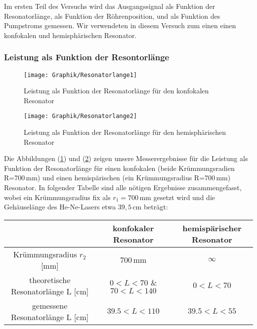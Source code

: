 \documentclass[10pt,twoside]{article}
\renewcommand{\1}{^{-1}}
\renewcommand{\2}{^{-2}}
\newcommand{\3}{^{-3}}
\newcommand{\4}{^{-4}}
\newcommand{\5}{^{-5}}
\newcommand{\6}{^{-6}}
\newcommand{\7}{^{-7}}
\newcommand{\8}{^{-8}}
\newcommand{\9}{^{-9}}
\begin{document}
Im ersten Teil des Versuchs wird das Ausgangssignal als Funktion der Resonatorlänge, als Funktion der Röhrenposition, und als Funktion des Pumpstroms gemessen. Wir verwendeten in diesem Versuch zum einen einen konfokalen und hemisphärischen Resonator.

\subsubsection{Leistung als Funktion der Resontorlänge}
\begin{figure}[H]
\centering
\texttt{[image: Graphik/Resonatorlange1]} 
\caption{Leistung als Funktion der Resonatorlänge für den konfokalen Resonator}
\label{fig:Resonatorlange1}
\end{figure}
\begin{figure}[H]
\centering
\texttt{[image: Graphik/Resonatorlange2]} 
\caption{Leistung als Funktion der Resonatorlänge für den hemisphärischen Resonator}
\label{fig:Resonatorlange2}
\end{figure}
Die Abbildungen (\ref{fig:Resonatorlange1}) und (\ref{fig:Resonatorlange2}) zeigen unsere Messerergebnisse für die Leistung als Funktion der Resonatorlänge für einen konfokalen (beide Krümmungsradien R=700\,mm) und einen hemispärischen (ein Krümmungsradius R=700\,mm) Resonator. In folgender Tabelle sind alle nötigen Ergebnisse zusammengefasst, wobei ein Krümmungsradius fix als $r_1=700$\,mm gesetzt wird und die Gehäuselänge des He-Ne-Lasers etwa $39,5$\,cm beträgt:

\begin{tabular}{c||c|c}
~ & konfokaler Resonator & hemispärischer Resonator \\ 
\hline 
Krümmungsradius $r_2$ [mm] & 700\,mm & $\infty$ \\ 
\hline 
theoretische Resonatorlänge L [cm] & $0< L <70$ \& $70< L< 140$ & $0<L<70$ \\ 
\hline 
gemessene Resonatorlänge L [cm] & $39.5<L<110$ & $39.5 < L < 55$ \\ 
\hline 
\end{tabular} 
\end{document}
